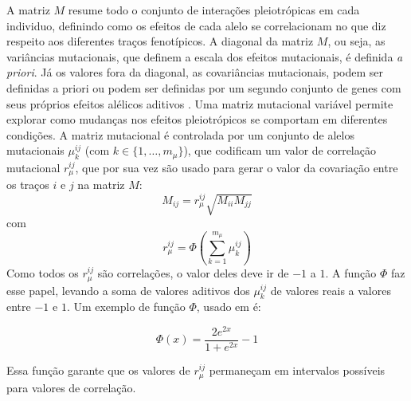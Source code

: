 A matriz $M$ resume todo o conjunto de interações pleiotrópicas em cada
individuo, definindo como os efeitos de cada alelo se correlacionam no
que diz respeito aos diferentes traços fenotípicos.
A diagonal da matriz $M$, ou seja, as variâncias mutacionais, que
definem a escala dos efeitos mutacionais, é definida {\it a priori}.
Já os valores fora da diagonal, as covariâncias mutacionais, podem ser
definidas a priori \citep{Jones2003, Jones2004} ou podem ser definidas
por um segundo conjunto de genes com seus próprios efeitos alélicos
aditivos \citep{Jones2007}.
Uma matriz mutacional variável permite explorar como mudanças nos
efeitos pleiotrópicos se comportam em diferentes condições.
A matriz mutacional é controlada por um conjunto de alelos mutacionais
$\mu^{ij}_k$ (com $k \in \{1,\ldots,m_\mu\}$), que codificam um valor de
correlação mutacional $r_\mu^{ij}$, que por sua vez são usado para gerar
o valor da covariação entre os traços $i$ e $j$ na matriz $M$:
\begin{equation}
M_{ij} = r_\mu^{ij} \sqrt {M_{ii}M_{jj}}
\end{equation}
com
\begin{equation}
r_\mu^{ij} = \Phi \left(\sum_{k=1}^{m_\mu} \mu^{ij}_k\right)
\end{equation}
Como todos os $r_\mu^{ij}$ são correlações, o valor deles deve ir de
$-1$ a $1$.
A função $\Phi$ faz esse papel, levando a soma de valores
aditivos dos $\mu^{ij}_k$ de valores reais a valores entre $-1$ e $1$.
Um exemplo de função $\Phi$, usado em \cite{Jones2007} é:

\begin{equation}
\Phi (x) = \frac{2e^{2x}}{1+e^{2x}} - 1
\end{equation}

Essa função garante que os valores de $r_\mu^{ij}$ permaneçam em
intervalos possíveis para valores de correlação.


